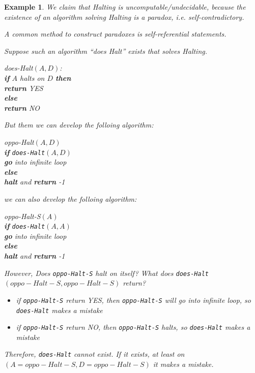\documentclass[twoside]{article}
\newcommand{\pc}[1]{\mbox{\textbf{#1}}} %
\newtheorem{protoexample}[prototheorem]{Example}
\newenvironment{example}
{\colorlet{shadecolor}{red!15}\begin{shaded}\begin{protoexample}\normalfont}
		{\end{protoexample}\end{shaded}}
\begin{document}
\begin{example}
		
		
	We claim that Halting is uncomputable/undecidable, because the existence of an algorithm solving Halting is a paradox, i.e. self-contradictory. 
		
	A common method to construct paradoxes is self-referential statements. 
		
	Suppose such an algorithm ``does Halt'' exists that solves Halting. 
	\begin{algorithme}
		does-Halt$(A, D)$:\\
		\>\pc{if} $A$ halts on $D$ \pc{then}\\
		\>\>\pc{return} YES\\
		\>\pc{else} \\
		\>\>\pc{return} NO
	\end{algorithme} 
	But them we can develop the folloing algorithm: 
	\begin{algorithme}
		oppo-Halt$(A, D)$\\
		\>\pc{if} \texttt{does-Halt}$(A, D)$\\
		\>\>\pc{go} into infinite loop\\
		\>\pc{else} \\
		\>\>\pc{halt} and \pc{return} -1
	\end{algorithme}
	we can also develop the folloing algorithm: 
	\begin{algorithme}
		oppo-Halt-S$(A)$\\
		\>\pc{if} \texttt{does-Halt}$(A, A)$\\
		\>\>\pc{go} into infinite loop\\
		\>\pc{else} \\
		\>\>\pc{halt} and \pc{return} -1
	\end{algorithme}
	However, Does \texttt{oppo-Halt-S} halt on itself? What does \texttt{does-Halt}$(oppo-Halt-S, oppo-Halt-S)$ return? \begin{itemize}
	\item if \texttt{oppo-Halt-S} return YES, then \texttt{oppo-Halt-S} will go into infinite loop, so \texttt{does-Halt} makes a mistake
	\item if \texttt{oppo-Halt-S} return NO, then \texttt{oppo-Halt-S} halts, so \texttt{does-Halt} makes a mistake
	\end{itemize}
	Therefore, \texttt{does-Halt}  cannot exist. If it exists, at least on $(A=oppo-Halt-S, D= oppo-Halt-S)$ it makes a mistake. 
\end{example}
\end{document}
